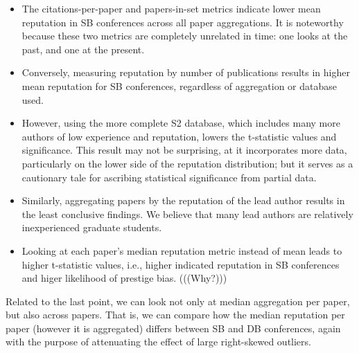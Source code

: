 \documentclass[12pt]{article}
\begin{document}
\begin{itemize}
\item
  The citations-per-paper and papers-in-set metrics indicate lower mean reputation in SB conferences across all paper aggregations. It is noteworthy because these two metrics are completely unrelated in time: one looks at the past, and one at the present.
\item
  Conversely, measuring reputation by number of publications results in higher mean reputation for SB conferences, regardless of aggregation or database used.
\item
  However, using the more complete S2 database, which includes many more authors of low experience and reputation, lowers the t-statistic values and significance. This result may not be surprising, at it incorporates more data, particularly on the lower side of the reputation distribution; but it serves as a cautionary tale for ascribing statistical significance from partial data.
\item
  Similarly, aggregating papers by the reputation of the lead author results in the least conclusive findings. We believe that many lead authors are relatively inexperienced graduate students.
\item
  Looking at each paper's median reputation metric instead of mean leads to higher t-statistic values, i.e., higher indicated reputation in SB conferences and higer likelihood of prestige bias. (((Why?)))
\end{itemize}

Related to the last point, we can look not only at median aggregation per paper, but also across papers.
That is, we can compare how the median reputation per paper (however it is aggregated) differs between SB and DB conferences, again with the purpose of attenuating the effect of large right-skewed outliers.
\end{document}
